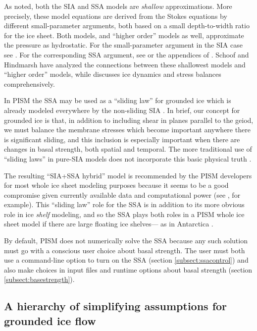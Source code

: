 \documentclass[titlepage,letterpaper,final]{scrartcl}
\begin{document}
As noted, both the SIA and SSA models are \emph{shallow} approximations.  More precisely, these model equations are derived from the Stokes equations by different small-parameter arguments, both based on a small depth-to-width ratio for the ice sheet.  Both models, and ``higher order'' models as well, approximate the pressure as hydrostatic.  For the small-parameter argument in the SIA case see \cite{Fowler}.  For the corresponding SSA argument, see \cite{WeisGreveHutter} or the appendices of \cite{SchoofStream}.  Schoof and Hindmarsh \cite{SchoofHindmarsh} have analyzed the connections between these shallowest models and ``higher order'' models, while \cite{GreveBlatter2009} discusses ice dynamics and stress balances comprehensively.

In PISM the SSA may be used as a ``sliding law'' for grounded ice which is already modeled everywhere by the non-sliding SIA \cite{BBssasliding}.  In brief, our concept for grounded ice is that, in addition to including shear in planes parallel to the geiod, we must balance the membrane stresses which become important anywhere there is significant sliding, and this inclusion is especially important when there are changes in basal strength, both spatial and temporal.  The more traditional use of ``sliding laws'' in pure-SIA models does not incorporate this basic physical truth \cite{Fowler01}.

The resulting ``SIA+SSA hybrid'' model is recommended by the PISM developers for most whole ice sheet modeling purposes because it seems to be a good compromise given currently available data and computational power (see \cite{BKAJS,Martinetal2011,Winkelmannetal2011}, for example).  This ``sliding law'' role for the SSA is in addition to its more obvious role in ice \emph{shelf} modeling, and so the SSA plays both roles in a PISM whole ice sheet model if there are large floating ice shelves--- as in Antarctica \cite{Martinetal2011,Winkelmannetal2011}.

By default, PISM does not numerically solve the SSA because any such solution must go with a conscious user choice about basal strength.  The user must both use a command-line option to turn on the SSA (section \ref{subsect:ssacontrol}) and also make choices in input files and runtime options about basal strength (section \ref{subsect:basestrength}).


\subsection{A hierarchy of simplifying assumptions for grounded ice flow}
\label{sec:model-hierarchy}
\end{document}
